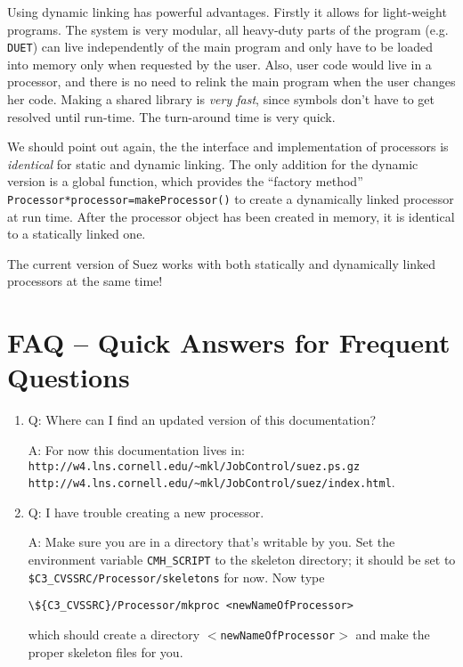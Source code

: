 \documentclass[12pt]{article}
\begin{document}
\begin{appendix}
Using dynamic linking has powerful advantages. Firstly it allows for
light-weight programs. The system is very modular, all heavy-duty parts
of the program (e.g. \texttt{DUET}) can live independently of the main
program and only have to be loaded into memory only when requested by
the user. Also, user code would live in a processor, and there is no
need to relink the main program when the user changes her code. Making a
shared library is \emph{very fast}, since symbols don't have
to get resolved until run-time. The turn-around time is very quick.

We should point out again, the the interface and implementation of
processors is \emph{identical} for static and dynamic linking. The only
addition for the dynamic version is a global function, which provides
the ``factory method'' \texttt{Processor*processor=makeProcessor()} to
create a dynamically linked processor at run time.  After the processor
object has been created in memory, it is identical to a statically
linked one.

The current version of Suez works with both statically and dynamically
linked processors at the same time!

\section{FAQ -- Quick Answers for Frequent Questions }
\label{sec:FAQ}

\begin{enumerate}

\item Q: Where can I find an updated version of this documentation?

\noindent A: For now this documentation lives in: \\
  \verb=http://w4.lns.cornell.edu/~mkl/JobControl/suez.ps.gz= \\
  \verb=http://w4.lns.cornell.edu/~mkl/JobControl/suez/index.html=.

\item Q: I have trouble creating a new processor.

\noindent A: Make sure you are in a directory that's writable by
you. Set the environment variable \texttt{CMH\_SCRIPT} to the skeleton
directory; it should be set to
\texttt{\${C3\_CVSSRC}/Processor/skeletons} for now.  Now type
\begin{verbatim}
\${C3_CVSSRC}/Processor/mkproc <newNameOfProcessor>
\end{verbatim} 
which should create a directory \texttt{$<$newNameOfProcessor$>$} and
make the proper skeleton files for you.


\end{enumerate}
\end{appendix}
\end{document}

